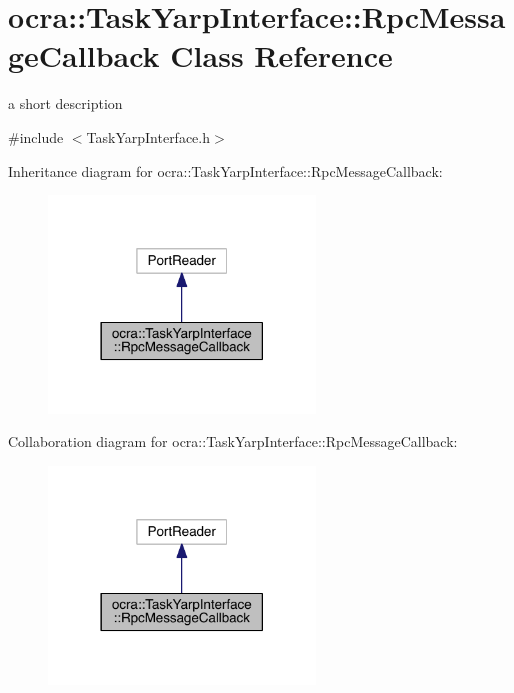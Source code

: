 \hypertarget{classocra_1_1TaskYarpInterface_1_1RpcMessageCallback}{}\section{ocra\+:\+:Task\+Yarp\+Interface\+:\+:Rpc\+Message\+Callback Class Reference}
\label{classocra_1_1TaskYarpInterface_1_1RpcMessageCallback}


a short description  




{\ttfamily \#include $<$Task\+Yarp\+Interface.\+h$>$}



Inheritance diagram for ocra\+:\+:Task\+Yarp\+Interface\+:\+:Rpc\+Message\+Callback\+:\nopagebreak
\begin{figure}[H]
\begin{center}
\leavevmode
\includegraphics[width=201pt]{df/df4/classocra_1_1TaskYarpInterface_1_1RpcMessageCallback__inherit__graph}
\end{center}
\end{figure}


Collaboration diagram for ocra\+:\+:Task\+Yarp\+Interface\+:\+:Rpc\+Message\+Callback\+:\nopagebreak
\begin{figure}[H]
\begin{center}
\leavevmode
\includegraphics[width=201pt]{da/d08/classocra_1_1TaskYarpInterface_1_1RpcMessageCallback__coll__graph}
\end{center}
\end{figure}
